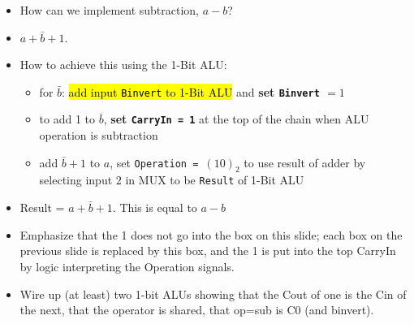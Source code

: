     
   

\begin{frame}[fragile]
\begin{itemize}
\item How can we implement subtraction, $ a - b$?
\item $a + \bar{b} + 1$. 
\item How to achieve this using the 1-Bit ALU:
\begin{itemize}
    \item for $\bar{b}$: \hl{add input \texttt{Binvert} to 1-Bit ALU} and \textbf{set \texttt{Binvert} $ = 1$}
    \item to add 1 to $\bar{b}$, \textbf{set \texttt{CarryIn = 1}} {\footnotesize at the top of the chain when ALU operation is subtraction}
    \item add $\bar{b} + 1$ to $a$, set \texttt{Operation = }$(10)_2$ {\footnotesize to use result of adder by selecting input $2$ in MUX to be \texttt{Result} of 1-Bit ALU}
\end{itemize}
\item Result = $a + \bar{b} + 1$. This is equal to $a - b$ 
\end{itemize}

\BNotes\ifnum{}
\begin{itemize}
\item Emphasize that the 1 does not go into the box on this slide; each box
	on the previous slide is replaced by this box, and the 1 is put into
	the top CarryIn by logic interpreting the Operation signals.
\item Wire up (at least) two 1-bit ALUs showing that the Cout of one is the
	Cin of the next, that the operator is shared, that op=sub is C0 (and
	binvert).
\end{itemize}
\fi\ENotes
\end{frame}

